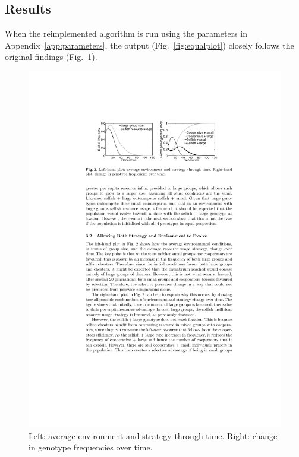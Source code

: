 \documentclass[11pt]{article}
\begin{document}
\subsection{Results}
When the reimplemented algorithm is run using the parameters in Appendix~\ref{app:parameters}, the output (Fig.~\ref{fig:equalplot}) closely follows the original findings (Fig.~\ref{fig:original}).
\vspace{-.5cm}
\begin{figure}[!ht]
  \centering
  \includegraphics[scale=1.25]{original.pdf}
  \caption{Left: average environment and strategy through time. \newline Right: change in genotype frequencies over time. \citep{orig} }
  \label{fig:original}
\end{figure}
\end{document}
